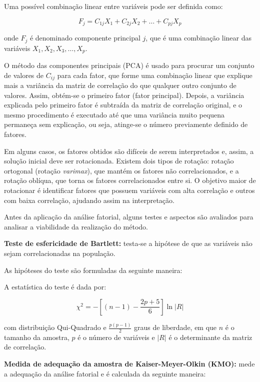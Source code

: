 \documentclass[
  portuguese,
]{estat/estat}
\begin{document}
Uma possível combinação linear entre variáveis pode ser definida como:

\[ F_j = C_{1j} X_1 + C_{2j} X_2 + \ldots + C_{pj} X_p \]

onde \(F_j\) é denominado componente principal \(j\), que é uma
combinação linear das variáveis \(X_1, X_2, X_3, \ldots, X_p\).

O método das componentes principais (PCA) é usado para procurar um
conjunto de valores de \(C_{ij}\) para cada fator, que forme uma
combinação linear que explique mais a variância da matriz de correlação
do que qualquer outro conjunto de valores. Assim, obtém-se o primeiro
fator (fator principal). Depois, a variância explicada pelo primeiro
fator é subtraída da matriz de correlação original, e o mesmo
procedimento é executado até que uma variância muito pequena permaneça
sem explicação, ou seja, atinge-se o número previamente definido de
fatores.

Em alguns casos, os fatores obtidos são difíceis de serem interpretados
e, assim, a solução inicial deve ser rotacionada. Existem dois tipos de
rotação: rotação ortogonal (rotação \emph{varimax}), que mantém os
fatores não correlacionados, e a rotação oblíqua, que torna os fatores
correlacionados entre si. O objetivo maior de rotacionar é identificar
fatores que possuem variáveis com alta correlação e outros com baixa
correlação, ajudando assim na interpretação.

Antes da aplicação da análise fatorial, alguns testes e aspectos são
avaliados para analisar a viabilidade da realização do método.

\textbf{Teste de esfericidade de Bartlett:} testa-se a hipótese de que
as variáveis não sejam correlacionadas na população.

As hipóteses do teste são formuladas da seguinte maneira:


A estatística do teste é dada por:

\[
\chi^2 = -\left[(n-1) - \frac{2p + 5}{6}\right] \ln |R|
\]

com distribuição Qui-Quadrado e \(\frac{p(p-1)}{2}\) graus de liberdade,
em que \(n\) é o tamanho da amostra, \(p\) é o número de variáveis e
\(|R|\) é o determinante da matriz de correlação.

\textbf{Medida de adequação da amostra de Kaiser-Meyer-Olkin (KMO):}
mede a adequação da análise fatorial e é calculada da seguinte maneira:
\end{document}

